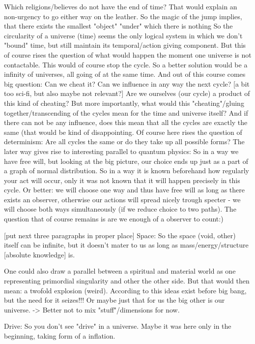 \documentclass[10pt]{book}
\begin{document}
Which religions/believes do not have the end of time? That would explain an non-urgency to go either way on the leather.
So the magic of the jump implies, that there exists the smallest "object" "under" which there is nothing
So the circularity of a universe (time) seems the only logical system in which we don't "bound" time, but still maintain its temporal/action giving component.
But this of course rises the question of what would happen the moment one universe is not contactable. This would of course stop the cycle. So a better solution would be a infinity of universes, all going of at the same time.
And out of this course comes big question: Can we cheat it? Can we influence in any way the next cycle? [a bit too sci-fi, but also maybe not relevant?] Are we ourselves (our cycle) a product of this kind of cheating? But more importantly, what would this "cheating"/gluing together/transcending of the cycles mean for the time and universe itself?
And if there can not be any influence, does this mean that all the cycles are exactly the same (that would be kind of disappointing. Of course here rises the question of determinism: Are all cycles the same or do they take up all possible forms? The later way gives rise to interesting parallel to quantum physics: So in a way we have free will, but looking at the big picture, our choice ends up just as a part of a graph of normal distribution. So in a way it is known beforehand how regularly your act will occur, only it was not known that it will happen precisely in this cycle. Or better: we will choose one way and thus have free will as long as there exists an observer, otherwise our actions will spread nicely trough specter - we will choose both ways simultaneously (if we reduce choice to two paths). The question that of course remains is are we enough of a observer to count:)

[put next three paragraphs in proper place]
Space:
So the space (void, other) itself can be infinite, but it doesn't mater to us as long as mass/energy/structure [absolute knowledge] is. 

One could also draw a parallel between a spiritual and material world as one representing primordial singularity and other the other side. But that would then mean: 
a twofold explosion (weird). According to this ideas exist before big bang, but the need for it seizes!!! Or maybe just that for us the big other is our universe. -> Better not to mix "stuff"/dimensions for now.

Drive: So you don't see "drive" in a universe. Maybe it was here only in the beginning, taking form of a inflation.
\end{document}
